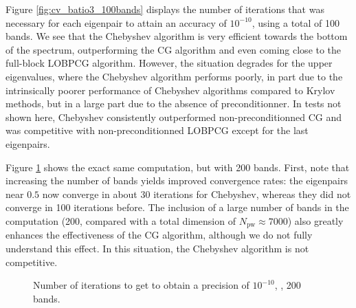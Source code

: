 \documentclass[11pt]{elsarticle}
\newcommand{\axisopt}{height = 10cm, width = 14cm}
\newcommand{\npw}{\ensuremath{N_{\text{pw}}}\xspace}
\newcommand{\chebmarker}{square}
\newcommand{\lobpcgmarker}{triangle}
\begin{document}
Figure \ref{fig:cv_batio3_100bands} displays the number of iterations
that was necessary for each eigenpair to attain an accuracy of
$10^{-10}$, using a total of 100 bands. We see that the Chebyshev
algorithm is very efficient towards the bottom of the spectrum,
outperforming the CG algorithm and even coming close to the full-block
LOBPCG algorithm. However, the situation degrades for the upper
eigenvalues, where the Chebyshev algorithm performs poorly, in part
due to the intrinsically poorer performance of Chebyshev algorithms
compared to Krylov methods, but in a large part due to the absence of
preconditionner. In tests not shown here, Chebyshev consistently
outperformed non-preconditionned CG and was competitive with
non-preconditionned LOBPCG except for the last eigenpairs.

Figure \ref{fig:cv_batio3_200bands} shows the exact same computation,
but with 200 bands. First, note that increasing the number of bands
yields improved convergence rates: the eigenpairs near $0.5$ now converge in
about 30 iterations for Chebyshev, whereas they did not converge in
100 iterations before. The inclusion of a large number of bands in the
computation (200, compared with a total dimension of $\npw \approx
7000$) also greatly enhances the effectiveness of the CG algorithm,
although we do not fully understand this effect. In this situation,
the Chebyshev algorithm is not competitive.

\begin{figure}[h!]
  \centering
  {
  }
  \caption{Number of iterations to get to obtain a precision of $10^{-10}$,
    , 200 bands.}
  \label{fig:cv_batio3_200bands}
\end{figure}
\end{document}
